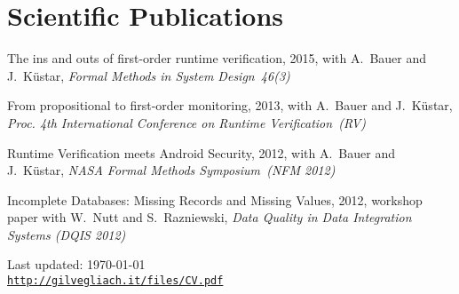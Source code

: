 \documentclass[letterpaper]{article}
\def\footerlink{http://gilvegliach.it/files/CV.pdf}
\newenvironment{no-indent-itemize}{
  \begin{list}{}{
    \setlength{\leftmargin}{0em}
  }
}{
  \end{list}
}
\begin{document}
\section*{Scientific Publications}
\begin{no-indent-itemize}
  \item The ins and outs of first-order runtime verification, 2015, with A.~Bauer and J.~K\"{u}star, 
        {\it Formal Methods in System Design~46(3)}
  \item From propositional to first-order monitoring, 2013, with A.~Bauer and J.~K\"{u}star, 
        {\it Proc. 4th International Conference on Runtime Verification~(RV)}
  \item Runtime Verification meets Android Security, 2012, with A.~Bauer and J.~K\"{u}star, 
        {\it NASA Formal Methods Symposium~(NFM 2012)}
  \item Incomplete Databases: Missing Records and Missing Values, 2012, workshop paper with 
        W.~Nutt and S.~Razniewski, {\it Data Quality in Data Integration Systems (DQIS 2012)}
\end{no-indent-itemize}

\bigskip
\begin{center}
  \begin{footnotesize}
    Last updated: \today \\
    \href{\footerlink}{\texttt{\footerlink}}
  \end{footnotesize}
\end{center}
\end{document}
